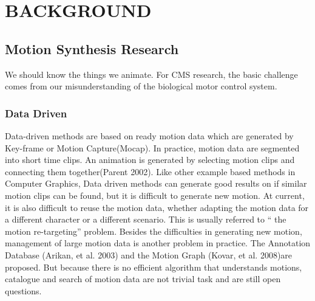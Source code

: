 \chapter{BACKGROUND}
\section{Motion Synthesis Research}
We should know the things we animate. 
For CMS research, the basic challenge comes from our misunderstanding of the biological motor control system.
\subsection*{Data Driven}
Data-driven methods are based on ready motion data which are generated by Key-frame or Motion Capture(Mocap). 
In practice, motion data are segmented into short time clips. 
An animation is generated by selecting motion clips and connecting them together(Parent 2002).
Like other example based methods in Computer Graphics, Data driven methods can generate good results on if similar motion clips can be found, but it is difficult to generate new motion.
At current, it is also difficult to reuse the motion data, whether adapting the motion data for
a different character or a different scenario. This is usually referred to “ the motion re-targeting”
problem.
Besides the difficulties in generating new motion, management of large motion data is another
problem in practice. The Annotation Database (Arikan, et al. 2003) and the Motion
Graph (Kovar, et al. 2008)are proposed. But because there is no efficient algorithm that understands
motions, catalogue and search of motion data are not trivial task and are still open
questions.
